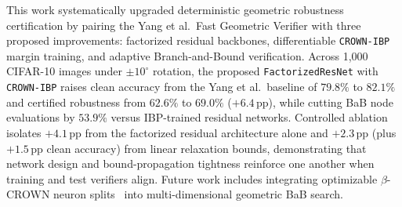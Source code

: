 \documentclass[conference]{IEEEtran}
\begin{document}
This work systematically upgraded deterministic geometric robustness
certification by pairing the Yang et al.\ Fast Geometric Verifier with
three proposed improvements: factorized residual backbones,
differentiable \texttt{CROWN-IBP} margin training, and adaptive
Branch-and-Bound verification.
Across 1,000 CIFAR-10 images under ${\pm}10^\circ$ rotation, the proposed
\texttt{FactorizedResNet} with \texttt{CROWN-IBP} raises clean accuracy from
the Yang et al.\ baseline of $79.8\%$ to $82.1\%$ and certified robustness
from $62.6\%$ to $69.0\%$ ($+6.4\,\text{pp}$), while cutting BaB node
evaluations by $53.9\%$ versus IBP-trained residual networks.
Controlled ablation isolates $+4.1\,\text{pp}$ from the factorized residual
architecture alone and $+2.3\,\text{pp}$ (plus $+1.5\,\text{pp}$ clean
accuracy) from linear relaxation bounds, demonstrating that network design
and bound-propagation tightness reinforce one another when training and test
verifiers align.
Future work includes integrating optimizable $\beta$-CROWN neuron
splits~\cite{b13} into multi-dimensional geometric BaB search.
\end{document}
